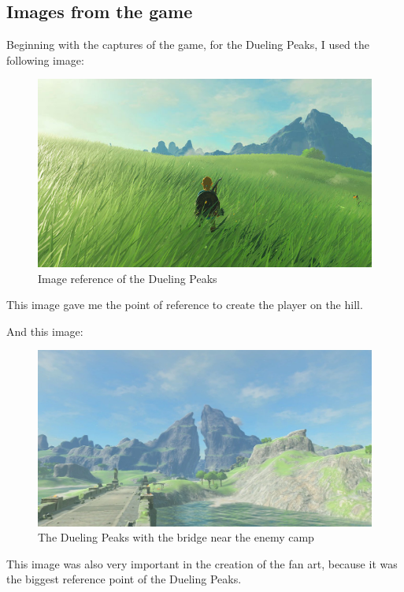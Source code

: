 \documentclass{cup-pan}
\begin{document}
    \subsection*{Images from the game}
    Beginning with the captures of the game, for the Dueling Peaks, I used the following image:\\
    \begin{figure}[H]
        \includegraphics[width=\textwidth]{Imagenes/Referencias/article_img03_1.jpg}
        \caption{Image reference of the Dueling Peaks}
    \end{figure}
    This image gave me the point of reference to create the player on the hill. 

    And this image: 
    \begin{figure}[H]
        \includegraphics[width=\textwidth]{Imagenes/Referencias/Dueling_Peaks.png}
        \caption{The Dueling Peaks with the bridge near the enemy camp}
    \end{figure}
    This image was also very important in the creation of the fan art, because it was the biggest reference point of the Dueling Peaks.\\
\end{document}
